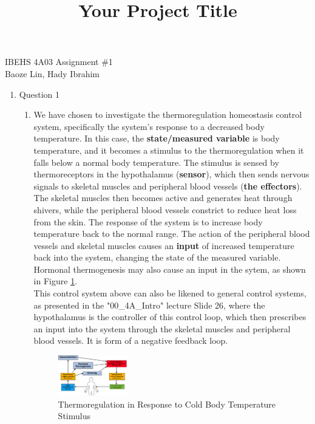 \documentclass[12pt]{article}
\title{Your Project Title}
\begin{document}
IBEHS 4A03 \hfill Assignment \#1\\
Baoze Lin, Hady Ibrahim

\hrulefill

\renewcommand{\theenumii}{\arabic{enumi}.\arabic{enumii}}

\begin{enumerate}
\item Question 1
  \begin{enumerate}
  \item We have chosen to investigate the thermoregulation homeostasis control system, specifically the system's response to a decreased body temperature. In this case, the \textbf{state/measured variable} is body temperature, and it becomes a stimulus to the thermoregulation when it falls below a normal body temperature. The stimulus is sensed by thermoreceptors in the hypothalamus (\textbf{sensor}), which then sends nervous signals to skeletal muscles and peripheral blood vessels (\textbf{the effectors}). 
    \\

    The skeletal muscles then becomes active and generates heat through shivers, while the peripheral blood vessels constrict to reduce heat loss from the skin. The response of the system is to increase body temperature back to the normal range. The action of the peripheral blood vessels and skeletal muscles causes an \textbf{input} of increased temperature back into the system, changing the state of the measured variable. Hormonal thermogenesis may also cause an input in the sytem, as shown in Figure \ref{fig:figure11}.
    \\
    
    This control system above can also be likened to general control systems, as presented in the "00\_4A\_Intro" lecture Slide 26, where the hypothalamus is the controller of this control loop, which then prescribes an input into the system through the skeletal muscles and peripheral blood vessels. It is form of a negative feedback loop.

    \begin{figure}[H]
      \centering
      \includegraphics[width=0.3\textwidth]{Figures/figure11.png}
      \caption{Thermoregulation in Response to Cold Body Temperature Stimulus}
      \label{fig:figure11} 
    \end{figure}


\end{enumerate}
\end{enumerate}
\end{document}
